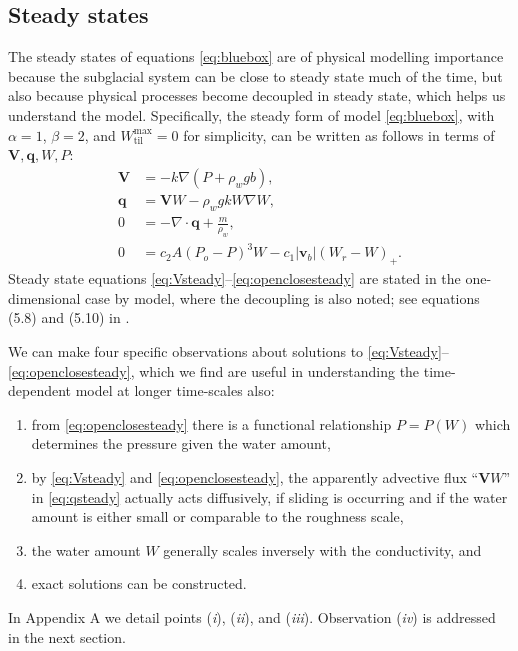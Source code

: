 \documentclass[gmd]{copernicus}   %
\newcommand{\text}{\textrm}
\newcommand\bv{\mathbf{v}}
\newcommand\bV{\mathbf{V}}
\newcommand\bq{\mathbf{q}}
\newcommand{\Div}{\nabla\cdot}
\newcommand{\grad}{\nabla}
\newcommand{\Wtilmax}{W_{\text{til}}^{\text{max}}}
\begin{document}
\subsection{Steady states}  \label{subsec:steady} The steady states of equations \eqref{eq:bluebox} are of physical modelling importance because the subglacial system can be close to steady state much of the time, but also because physical processes become decoupled in steady state, which helps us understand the model.  Specifically, the steady form of model \eqref{eq:bluebox}, with $\alpha=1$, $\beta=2$, and $\Wtilmax=0$ for simplicity, can be written as follows in terms of $\bV,\bq,W,P$:
\begin{align}
\bV &= - k \grad \left(P + \rho_w g b\right), \label{eq:Vsteady} \\
\bq &= \bV W - \rho_w g k W \grad W, \label{eq:qsteady} \\
0 &= - \Div \bq + \frac{m}{\rho_w}, \label{eq:masscontsteady} \\
0 &= c_2 A (P_o - P)^3 W - c_1 |\bv_b| (W_r - W)_+. \label{eq:openclosesteady}
\end{align}
Steady state equations \eqref{eq:Vsteady}--\eqref{eq:openclosesteady} are stated in the one-dimensional case by \cite{Schoofetal2012} model, where the decoupling is also noted; see equations (5.8) and (5.10) in \citep{Schoofetal2012}.

We can make four specific observations about solutions to \eqref{eq:Vsteady}--\eqref{eq:openclosesteady}, which we find are useful in understanding the time-dependent model at longer time-scales also:
\renewcommand{\labelenumi}{(\emph{\roman{enumi}})}
\begin{enumerate}
\item from \eqref{eq:openclosesteady} there is a functional relationship $P=P(W)$ which determines the pressure given the water amount,
\item by \eqref{eq:Vsteady} and \eqref{eq:openclosesteady}, the apparently advective flux ``$\bV W$'' in \eqref{eq:qsteady} actually acts diffusively, if sliding is occurring and if the water amount is either small or comparable to the roughness scale,
\item the water amount $W$ generally scales inversely with the conductivity, and
\item exact solutions can be constructed.
\end{enumerate}
In Appendix A we detail points (\emph{i}), (\emph{ii}), and (\emph{iii}).  Observation (\emph{iv}) is addressed in the next section.
\end{document}
